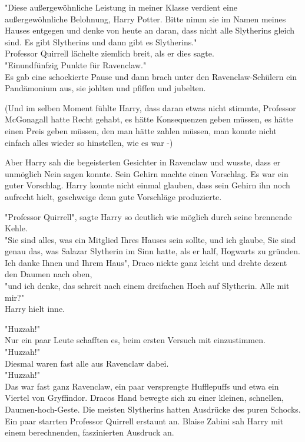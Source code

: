 {"Diese außergewöhnliche Leistung in meiner Klasse verdient eine außergewöhnliche Belohnung, Harry Potter. Bitte nimm sie im Namen meines Hauses entgegen und denke von heute an daran, dass nicht alle Slytherins gleich sind. Es gibt Slytherins und dann gibt es Slytherins."\\ Professor Quirrell lächelte ziemlich breit, als er dies sagte.\\ "Einundfünfzig Punkte für Ravenclaw."\\ Es gab eine schockierte Pause und dann brach unter den Ravenclaw-Schülern ein Pandämonium aus, sie johlten und pfiffen und jubelten.

(Und im selben Moment fühlte Harry, dass daran etwas nicht stimmte, Professor McGonagall hatte Recht gehabt, es hätte Konsequenzen geben müssen, es hätte einen Preis geben müssen, den man hätte zahlen müssen, man konnte nicht einfach alles wieder so hinstellen, wie es war -)

Aber Harry sah die begeisterten Gesichter in Ravenclaw und wusste, dass er unmöglich Nein sagen konnte. Sein Gehirn machte einen Vorschlag. Es war ein guter Vorschlag. Harry konnte nicht einmal glauben, dass sein Gehirn ihn noch aufrecht hielt, geschweige denn gute Vorschläge produzierte.

"Professor Quirrell", sagte Harry so deutlich wie möglich durch seine brennende Kehle.\\ "Sie sind alles, was ein Mitglied Ihres Hauses sein sollte, und ich glaube, Sie sind genau das, was Salazar Slytherin im Sinn hatte, als er half, Hogwarts zu gründen. Ich danke Ihnen und Ihrem Haus", Draco nickte ganz leicht und drehte dezent den Daumen nach oben,\\ "und ich denke, das schreit nach einem dreifachen Hoch auf Slytherin. Alle mit mir?"\\ Harry hielt inne.

"Huzzah!"\\ Nur ein paar Leute schafften es, beim ersten Versuch mit einzustimmen.\\ "Huzzah!"\\ Diesmal waren fast alle aus Ravenclaw dabei.\\ "Huzzah!"\\ Das war fast ganz Ravenclaw, ein paar versprengte Hufflepuffs und etwa ein Viertel von Gryffindor. Dracos Hand bewegte sich zu einer kleinen, schnellen, Daumen-hoch-Geste. Die meisten Slytherins hatten Ausdrücke des puren Schocks.\\ Ein paar starrten Professor Quirrell erstaunt an. Blaise Zabini sah Harry mit einem berechnenden, faszinierten Ausdruck an.

}
